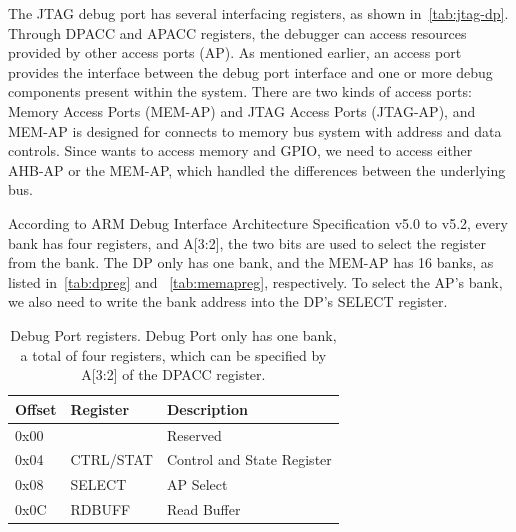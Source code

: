 The JTAG debug port has several interfacing registers, as shown in~\autoref{tab:jtag-dp}. Through DPACC and APACC registers, the debugger can access resources provided by other access ports (AP).  As mentioned earlier, an access port provides the interface between the debug port interface and one or more debug components present within the system. There are two kinds of access ports: Memory Access Ports (MEM-AP) and JTAG Access Ports (JTAG-AP), and MEM-AP is designed for connects to memory bus system with address and data controls.  Since \name wants to access memory and GPIO, we need to access either AHB-AP or the MEM-AP, which handled the differences between the underlying bus.



%
%

 According to ARM Debug Interface Architecture Specification v5.0 to v5.2, every bank has four registers, and A[3:2], the two bits are used to select the register from the bank. The DP only has one bank, and the MEM-AP has 16 banks, as listed in~\autoref{tab:dpreg} and ~\autoref{tab:memapreg}, respectively. To select the AP's bank, we also need to write the bank address into the DP's SELECT register.




\begin{center}
	\begin{table}
		\small
		\begin{tabular}{l l l} 
			\hline
			Offset & Register &  Description  \\ 
			\hline
			0x00 & & Reserved \\
			\hline
			0x04 & CTRL/STAT & Control and State Register \\
			\hline
			0x08 & SELECT & AP Select \\
			\hline
			0x0C & RDBUFF & Read Buffer\\
			\hline
		\end{tabular}
		\caption{Debug Port registers. Debug Port only has one bank, a total of four registers, which can be specified by A[3:2] of the DPACC register. }
		\label{tab:dpreg}
	\end{table}
\end{center}

